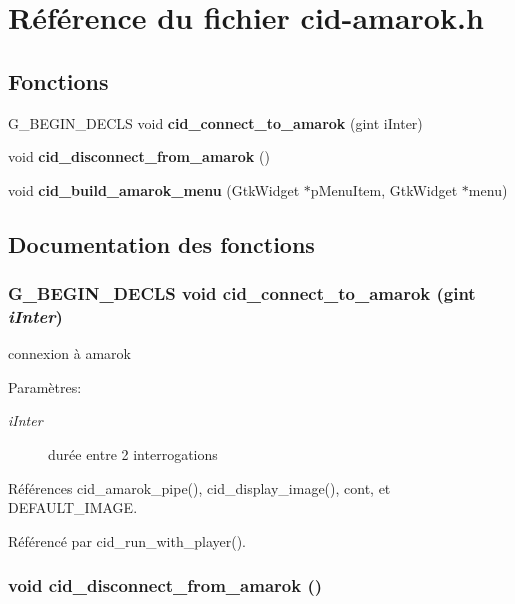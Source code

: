 \section{Référence du fichier cid-amarok.h}
\label{cid-amarok_8h}
\subsection*{Fonctions}
\begin{CompactItemize}
\item 
G\_\-BEGIN\_\-DECLS void {\bf cid\_\-connect\_\-to\_\-amarok} (gint iInter)
\item 
void {\bf cid\_\-disconnect\_\-from\_\-amarok} ()
\item 
void {\bf cid\_\-build\_\-amarok\_\-menu} (GtkWidget $\ast$pMenuItem, GtkWidget $\ast$menu)
\end{CompactItemize}


\subsection{Documentation des fonctions}
\subsubsection{\setlength{\rightskip}{0pt plus 5cm}G\_\-BEGIN\_\-DECLS void cid\_\-connect\_\-to\_\-amarok (gint {\em iInter})}\label{cid-amarok_8h_db0fb988775fd9ab349cab7d254ff84c}


connexion à amarok \begin{Desc}
\item[Paramètres:]
\begin{description}
\item[{\em iInter}]durée entre 2 interrogations \end{description}
\end{Desc}


Références cid\_\-amarok\_\-pipe(), cid\_\-display\_\-image(), cont, et DEFAULT\_\-IMAGE.

Référencé par cid\_\-run\_\-with\_\-player().
\subsubsection{\setlength{\rightskip}{0pt plus 5cm}void cid\_\-disconnect\_\-from\_\-amarok ()}\label{cid-amarok_8h_e848f864ad06f0d0260ba26b4a74bb60}


